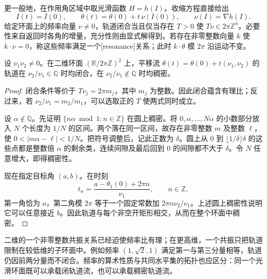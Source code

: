 更一般地，在作用角区域中取光滑函数 \(H=h(I)\)。收缩方程直接给出
\begin{equation}\label{g4:eq:1104:torus-translation}
	I(t)=I(0),\qquad
	\theta(t)=\theta(0)+t\,\nu(I(0)),
	\qquad \nu(I)=\nabla h(I).
\end{equation}
给定环面上的频率向量 \(\nu\ne0\)，轨道闭合当且仅当存在 \(T>0\) 使 \(T\nu\in2\pi\mathbb Z^n\)。必要性来自返回时各角的增量，充分性则由显式解得到。若存在非零整数向量 \(k\) 使 \(k\cdot\nu=0\)，称这些频率满足一个[resonance]关系；此时 \(k\cdot\theta\) 模 \(2\pi\) 沿运动不变。

\begin{proposition}\label{g4:prop:1104:two-torus-orbits}
	设 \(\nu_1\nu_2\ne0\)。在二维环面 \((\mathbb R/2\pi\mathbb Z)^2\) 上，平移流 \(\theta(t)=\theta(0)+t(\nu_1,\nu_2)\) 的轨道在 \(\nu_2/\nu_1\in\mathbb Q\) 时均闭合，在 \(\nu_2/\nu_1\notin\mathbb Q\) 时均稠密。
\end{proposition}
\begin{proof}
	闭合条件等价于 \(T\nu_j=2\pi m_j\)，其中 \(m_j\) 为整数。因此闭合蕴含有理比；反过来，若 \(\nu_2/\nu_1=m_2/m_1\)，可以选取正的 \(T\) 使两式同时成立。

	设 \(\alpha\notin\mathbb Q\)。先证明 \(\{n\alpha\bmod1:n\in\mathbb Z\}\) 在圆上稠密。将 \(0,\alpha,\ldots,N\alpha\) 的小数部分放入 \(N\) 个长度为 \(1/N\) 的区间。两个落在同一区间，故存在非零整数 \(m\) 及整数 \(\ell\)，使 \(0<|m\alpha-\ell|<1/N\)。把符号调整后，记此正数为 \(\delta\)。圆上从 \(0\) 到 \(\lfloor1/\delta\rfloor\delta\) 的这些点都是整数倍 \(\alpha\) 的剩余类，连续间隙及最后回到 \(0\) 的间隙都不大于 \(\delta\)。令 \(N\) 任意增大，即得稠密性。

	现在指定目标角 \((a,b)\)。在时刻
	\[
		t_n=\frac{a-\theta_1(0)+2\pi n}{\nu_1},\qquad n\in\mathbb Z,
	\]
	第一角恰为 \(a\)，第二角模 \(2\pi\) 等于一个固定常数加 \(2\pi n\nu_2/\nu_1\)。上述圆上稠密性说明它可以任意接近 \(b\)。因此轨道与每个非空开矩形相交，从而在整个环面中稠密。
\end{proof}

二维的一个非零整数共振关系已经迫使频率比有理；在更高维，一个共振只把轨道限制在较低维的子环面中。例如频率 \((1,\sqrt2,1)\) 满足第一与第三分量相等，轨道仍因前两分量而不闭合。频率的算术性质与共同水平集的拓扑也应区分：同一个光滑环面既可以承载闭轨道流，也可以承载稠密轨道流。

